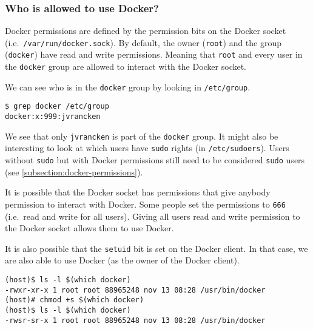 \subsubsection{Who is allowed to use Docker?}
Docker permissions are defined by the permission bits on the Docker socket (i.e.\ \lstinline{/var/run/docker.sock}). By default, the owner (\lstinline{root}) and the group (\lstinline{docker}) have read and write permissions. Meaning that \lstinline{root} and every user in the \lstinline{docker} group are allowed to interact with the Docker socket.

We can see who is in the \lstinline{docker} group by looking in \lstinline{/etc/group}.
\begin{lstlisting}[caption={See what users are in the \lstinline{docker} group.},captionpos=b]
$ grep docker /etc/group
docker:x:999:jvrancken
\end{lstlisting}
We see that only \lstinline{jvrancken} is part of the \lstinline{docker} group. It might also be interesting to look at which users have \lstinline{sudo} rights (in \lstinline{/etc/sudoers}). Users without \lstinline{sudo} but with Docker permissions still need to be considered \lstinline{sudo} users (see \autoref{subsection:docker-permissions}).

\hfill

It is possible that the Docker socket has permissions that give anybody permission to interact with Docker. Some people set the permissions to \lstinline{666} (i.e.\ read and write for all users). Giving all users read and write permission to the Docker socket allows them to use Docker.

\hfill

It is also possible that the \lstinline{setuid} bit is set on the Docker client. In that case, we are also able to use Docker (as the owner of the Docker client).

\begin{lstlisting}[caption={Permissions without and with the \lstinline{setuid} bit.},captionpos=b]
(host)$ ls -l $(which docker)
-rwxr-xr-x 1 root root 88965248 nov 13 08:28 /usr/bin/docker
(host)# chmod +s $(which docker)
(host)$ ls -l $(which docker)
-rwsr-sr-x 1 root root 88965248 nov 13 08:28 /usr/bin/docker
\end{lstlisting}
